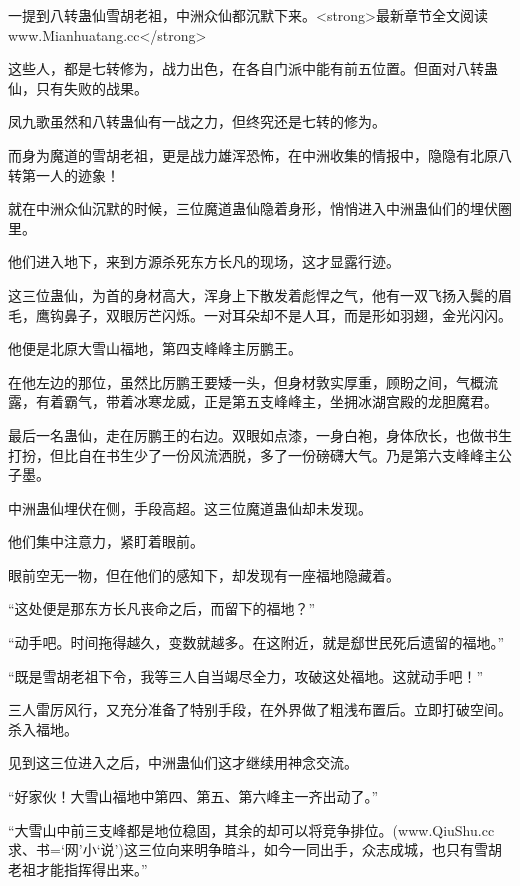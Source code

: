 
\begin{this_body}

一提到八转蛊仙雪胡老祖，中洲众仙都沉默下来。<strong>最新章节全文阅读www.Mianhuatang.cc</strong>

这些人，都是七转修为，战力出色，在各自门派中能有前五位置。但面对八转蛊仙，只有失败的战果。

凤九歌虽然和八转蛊仙有一战之力，但终究还是七转的修为。

而身为魔道的雪胡老祖，更是战力雄浑恐怖，在中洲收集的情报中，隐隐有北原八转第一人的迹象！

就在中洲众仙沉默的时候，三位魔道蛊仙隐着身形，悄悄进入中洲蛊仙们的埋伏圈里。

他们进入地下，来到方源杀死东方长凡的现场，这才显露行迹。

这三位蛊仙，为首的身材高大，浑身上下散发着彪悍之气，他有一双飞扬入鬓的眉毛，鹰钩鼻子，双眼厉芒闪烁。一对耳朵却不是人耳，而是形如羽翅，金光闪闪。

他便是北原大雪山福地，第四支峰峰主厉鹏王。

在他左边的那位，虽然比厉鹏王要矮一头，但身材敦实厚重，顾盼之间，气概流露，有着霸气，带着冰寒龙威，正是第五支峰峰主，坐拥冰湖宫殿的龙胆魔君。

最后一名蛊仙，走在厉鹏王的右边。双眼如点漆，一身白袍，身体欣长，也做书生打扮，但比自在书生少了一份风流洒脱，多了一份磅礴大气。乃是第六支峰峰主公子墨。

中洲蛊仙埋伏在侧，手段高超。这三位魔道蛊仙却未发现。

他们集中注意力，紧盯着眼前。

眼前空无一物，但在他们的感知下，却发现有一座福地隐藏着。

“这处便是那东方长凡丧命之后，而留下的福地？”

“动手吧。时间拖得越久，变数就越多。在这附近，就是郄世民死后遗留的福地。”

“既是雪胡老祖下令，我等三人自当竭尽全力，攻破这处福地。这就动手吧！”

三人雷厉风行，又充分准备了特别手段，在外界做了粗浅布置后。立即打破空间。杀入福地。

见到这三位进入之后，中洲蛊仙们这才继续用神念交流。

“好家伙！大雪山福地中第四、第五、第六峰主一齐出动了。”

“大雪山中前三支峰都是地位稳固，其余的却可以将竞争排位。(www.QiuShu.cc 求、书=‘网’小‘说’)这三位向来明争暗斗，如今一同出手，众志成城，也只有雪胡老祖才能指挥得出来。”


\end{this_body}
